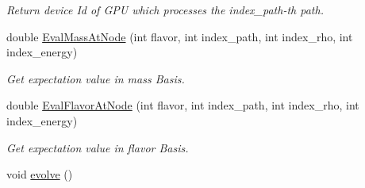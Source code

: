 \begin{DoxyCompactItemize}
\begin{DoxyCompactList}\small\item\em Return device Id of G\+PU which processes the index\+\_\+path-\/th path. \end{DoxyCompactList}\item 
double \hyperlink{classcudanusquids_1_1CudaNusquids_afc797c478f2cec5aeaac941b2ea61ea1}{Eval\+Mass\+At\+Node} (int flavor, int index\+\_\+path, int index\+\_\+rho, int index\+\_\+energy)\hypertarget{classcudanusquids_1_1CudaNusquids_afc797c478f2cec5aeaac941b2ea61ea1}{}\label{classcudanusquids_1_1CudaNusquids_afc797c478f2cec5aeaac941b2ea61ea1}

\begin{DoxyCompactList}\small\item\em Get expectation value in mass Basis. \end{DoxyCompactList}\item 
double \hyperlink{classcudanusquids_1_1CudaNusquids_a50ddee2d94a23a596e22b6c80bb033cd}{Eval\+Flavor\+At\+Node} (int flavor, int index\+\_\+path, int index\+\_\+rho, int index\+\_\+energy)\hypertarget{classcudanusquids_1_1CudaNusquids_a50ddee2d94a23a596e22b6c80bb033cd}{}\label{classcudanusquids_1_1CudaNusquids_a50ddee2d94a23a596e22b6c80bb033cd}

\begin{DoxyCompactList}\small\item\em Get expectation value in flavor Basis. \end{DoxyCompactList}\item 
void \hyperlink{classcudanusquids_1_1CudaNusquids_a67f231ca290b2c7b89e749b8c8bb2abb}{evolve} ()\hypertarget{classcudanusquids_1_1CudaNusquids_a67f231ca290b2c7b89e749b8c8bb2abb}{}\label{classcudanusquids_1_1CudaNusquids_a67f231ca290b2c7b89e749b8c8bb2abb}


\end{DoxyCompactItemize}
